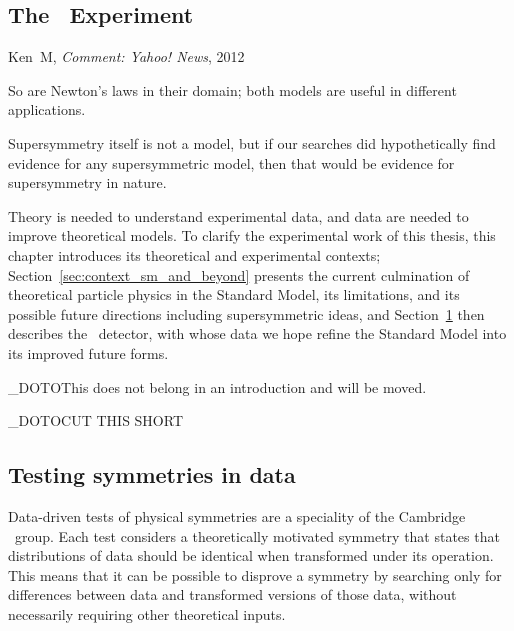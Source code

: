 \begin{singlespacing}
\section{The \atlas\ Experiment}
\label{sec:context_atlas}
%
\begin{epigraphs}
%
{Ken~M,
\textit{Comment: Yahoo! News},
2012~\cite{kenm2012inner}}
\end{epigraphs}
\end{singlespacing}





So are Newton's laws in their domain; both models are useful in different
applications.



Supersymmetry itself is not a model, but if our searches did hypothetically
find evidence for any supersymmetric model, then that would be evidence for
supersymmetry in nature.



\noindent Theory is needed to understand experimental data,
and data are needed to improve theoretical models.
To clarify the experimental work of this thesis, this chapter introduces its
theoretical and experimental contexts;
Section~\ref{sec:context_sm_and_beyond} presents the current culmination of
theoretical particle physics in the Standard Model, its limitations, and its
possible future directions including supersymmetric ideas, and
Section~\ref{sec:context_atlas} then describes the \atlas\ detector, with whose
data we hope refine the Standard Model into its improved future forms.




\NO_DOTO{This does not belong in an introduction and will be moved.}

\NO_DOTO{CUT THIS SHORT}

\subsection{Testing symmetries in data}
Data-driven tests of physical symmetries are a speciality of the Cambridge
\atlas\ group.
Each test considers a theoretically motivated symmetry that states that
distributions of data should be identical when transformed under its operation.
This means that it can be possible to disprove a symmetry by searching only
for differences between data and transformed versions of those data, without
necessarily requiring other theoretical inputs.

